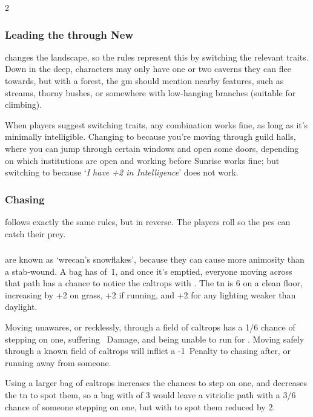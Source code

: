 \begin{multicols}{2}
\subsubsection{Leading the  through New }
changes the landscape, so the rules represent this by switching the relevant \glspl{trait}.
Down in the \gls{deep}, characters may only have one or two caverns they can flee towards, but with a forest, the \gls{gm} should mention nearby features, such as streams, thorny bushes, or somewhere with low-hanging branches (suitable for climbing).

When players suggest switching \glspl{trait}, any combination works fine, as long as it's minimally intelligible.
Changing to  because you're moving through guild halls, where you can jump through certain windows and open some doors, depending on which institutions are open and working before Sunrise works fine; but switching to  because `\textit{I have +2 in Intelligence}' does not work.

\subsubsection{Chasing}
\index{Chases|see {\expandafter\Glsentrytext{retreat}}}%
follows exactly the same rules, but in reverse.
The players roll so the \glspl{pc} can catch their prey.

\subsubsection{} are known as `\gls{wrecan}'s snowflakes',
because they can cause more animosity than a stab-wound.  A bag has
 of~1, and once it's emptied, everyone moving across that path
has a chance to notice the caltrops with .  The
\gls{tn} is 6 on a clean floor, increasing by +2 on grass, +2 if running, and
+2 for any lighting weaker than daylight.

Moving unawares, or recklessly, through a field of \glspl{caltrop} has a 1/6
chance of stepping on one, suffering ~Damage, and being unable to run
for .  Moving safely through a known field of \glspl{caltrop}
will inflict a -1~Penalty to chasing after, or running away from someone.

Using a larger bag of caltrops increases the chances to step on one, and
decreases the \gls{tn} to spot them, so a bag with  of 3 would
leave a vitriolic path with a 3/6 chance of someone stepping on one, but with
 to spot them reduced by 2.

\end{multicols}
